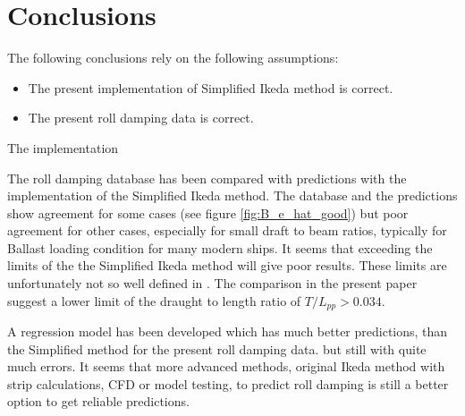\section{Conclusions}
\label{se:conclusions}
The following conclusions rely on the following assumptions:
\begin{itemize}
    \item The present implementation of Simplified Ikeda method is correct.
    \item The present roll damping data is correct. 
\end{itemize}
The implementation 



The roll damping database has been compared with predictions with the implementation of the Simplified Ikeda method. The database and the predictions show agreement for some cases (see figure \ref{fig:B_e_hat_good}) but poor agreement for other cases, especially for small draft to beam ratios, typically for Ballast loading condition for many modern ships. It seems that exceeding the limits of the the Simplified Ikeda method will give poor results. These limits are unfortunately not so well defined in \cite{kawahara_simple_2011}. The comparison in the present paper suggest a lower limit of the draught to length ratio of $T/L_{pp}>0.034$.


A regression model has been developed which has much better predictions, than the Simplified method for the present roll damping data. 
but still with quite much errors. It seems that more advanced methods, original Ikeda method with strip calculations, CFD or model testing, to predict roll damping is still a better option to get reliable predictions.  

